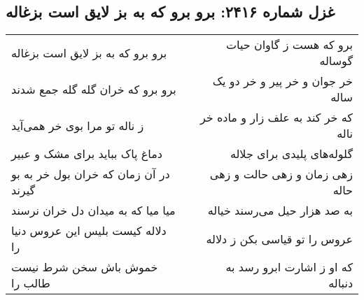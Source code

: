 \begin{center}
\section*{غزل شماره ۲۴۱۶: برو برو که به بز لایق است بزغاله}
\label{sec:2416}
\begin{longtable}{l p{0.5cm} r}
برو برو که به بز لایق است بزغاله
&&
برو که هست ز گاوان حیات گوساله
\\
برو برو که خران گله گله جمع شدند
&&
خر جوان و خر پیر و خر دو یک ساله
\\
ز ناله تو مرا بوی خر همی‌آید
&&
که خر کند به علف زار و ماده خر ناله
\\
دماغ پاک بباید برای مشک و عبیر
&&
گلوله‌های پلیدی برای جلاله
\\
در آن زمان که خران بول خر به بو گیرند
&&
زهی زمان و زهی حالت و زهی حاله
\\
میا میا که به میدان دل خران نرسند
&&
به صد هزار حیل می‌رسند خیاله
\\
دلاله کیست بلیس این عروس دنیا را
&&
عروس را تو قیاسی بکن ز دلاله
\\
خموش باش سخن شرط نیست طالب را
&&
که او ز اشارت ابرو رسد به دنباله
\\
\end{longtable}
\end{center}
